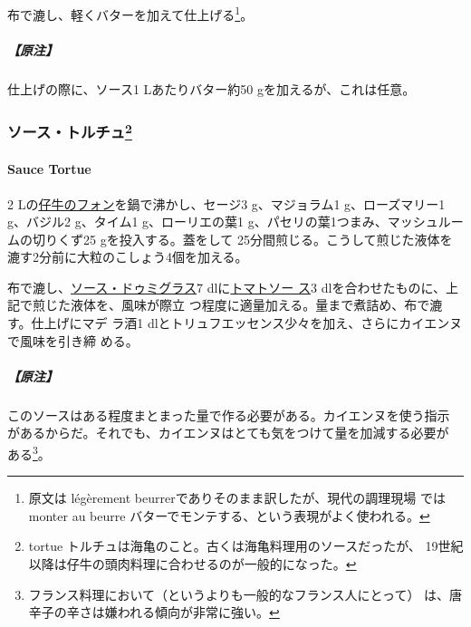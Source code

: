 \begin{recette}
布で漉し、軽くバターを加えて仕上げる\footnote{原文は légèrement
  beurrerでありそのまま訳したが、現代の調理現場 ではmonter au beurre
  バターでモンテする、という表現がよく使われる。}。

\hypertarget{ux539fux6ce8-9}{%
\subparagraph{【原注】}\label{ux539fux6ce8-9}}

仕上げの際に、ソース1 Lあたりバター約50 gを加えるが、これは任意。

\maeaki

\hypertarget{ux30bdux30fcux30b9ux30c8ux30ebux30c1ux30e593}{%
\subsubsection[ソース・トルチュ]{\texorpdfstring{ソース・トルチュ\footnote{tortue
  トルチュは海亀のこと。古くは海亀料理用のソースだったが、
  19世紀以降は仔牛の頭肉料理に合わせるのが一般的になった。}}{ソース・トルチュ}}\label{ux30bdux30fcux30b9ux30c8ux30ebux30c1ux30e593}}

\hypertarget{sauce-tortue}{%
\paragraph{Sauce Tortue}\label{sauce-tortue}}

  

2\undemi{}
Lの\protect\hyperlink{fonds-de-veau-brun}{仔牛のフォン}を鍋で沸かし、セージ3
g、マジョラム1 g、ローズマリー1 g、バジル2 g、タイム1 g、ローリエの葉1
g、パセリの葉1つまみ、マッシュルームの切りくず25 gを投入する。蓋をして
25分間煎じる。こうして煎じた液体を漉す2分前に大粒のこしょう4個を加える。

布で漉し、\protect\hyperlink{sauce-demi-glace}{ソース・ドゥミグラス}7
dlに\protect\hyperlink{sauce-tomate}{トマトソー ス}3
dlを合わせたものに、上記で煎じた液体を、風味が際立
つ程度に適量加える。\troisquarts{}量まで煮詰め、布で漉す。仕上げにマデ
ラ酒1 dlとトリュフエッセンス少々を加え、さらにカイエンヌで風味を引き締
める。

\hypertarget{ux539fux6ce8-10}{%
\subparagraph{【原注】}\label{ux539fux6ce8-10}}

このソースはある程度まとまった量で作る必要がある。カイエンヌを使う指示
があるからだ。それでも、カイエンヌはとても気をつけて量を加減する必要が
ある\footnote{フランス料理において（というよりも一般的なフランス人にとって）
  は、唐辛子の辛さは嫌われる傾向が非常に強い。}。


\end{recette}
